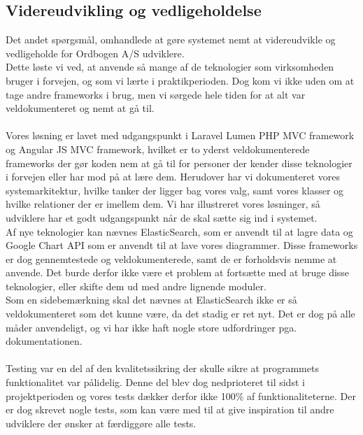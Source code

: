 \subsection{Videreudvikling og vedligeholdelse}
Det andet spørgsmål, omhandlede at gøre systemet nemt at videreudvikle og vedligeholde for Ordbogen A/S udviklere.
\\
Dette løste vi ved, at anvende så mange af de teknologier som virksomheden bruger i forvejen, og som vi lærte i praktikperioden. Dog kom vi ikke uden om at tage andre frameworks i brug, men vi sørgede hele tiden for at alt var veldokumenteret og nemt at gå til. 
\\\\
Vores løsning er lavet med udgangspunkt i Laravel Lumen PHP MVC framework og Angular JS MVC framework, hvilket er to yderst
veldokumenterede frameworks der gør koden nem at gå til for personer der kender disse teknologier i forvejen eller har mod på at lære dem.
Herudover har vi dokumenteret vores systemarkitektur, hvilke tanker der ligger bag vores valg, samt vores klasser og hvilke relationer der er imellem dem.
Vi har illustreret vores løsninger, så udviklere har et godt udgangspunkt når de skal sætte sig ind i systemet.
\\
Af nye teknologier kan nævnes ElasticSearch, som er anvendt til at lagre data og Google Chart API som er anvendt til at
lave vores diagrammer.
Disse frameworks er dog gennemtestede og veldokumenterede, samt de er forholdsvis nemme at anvende.
Det burde derfor ikke være et problem at fortsætte med at bruge disse teknologier, eller skifte dem ud med andre lignende moduler.
\\
Som en sidebemærkning skal det nævnes at ElasticSearch ikke er så veldokumenteret som det kunne være, da det stadig er ret nyt.
Det er dog på alle måder anvendeligt, og vi har ikke haft nogle store udfordringer pga. dokumentationen.
\\\\
Testing var en del af den kvalitetssikring der skulle sikre at programmets funktionalitet var pålidelig.
Denne del blev dog nedprioteret til sidst i projektperioden og vores tests dækker derfor ikke 100\% af funktionaliteterne.
Der er dog skrevet nogle tests, som kan være med til at give inspiration til andre udviklere der ønsker at færdiggøre alle tests.
